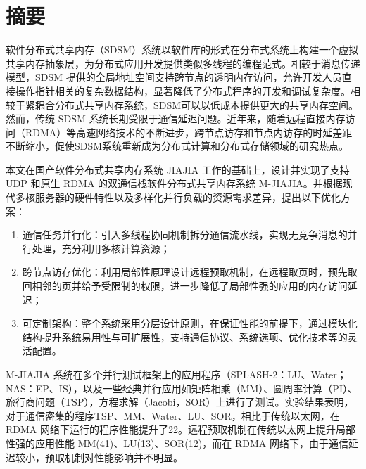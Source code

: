
\maketitle%
\MAKETITLE%
\makedeclaration%
\intobmk\chapter*{摘\quad 要}%
\setcounter{page}{1}%
软件分布式共享内存（SDSM）系统以软件库的形式在分布式系统上构建一个虚拟共享内存抽象层，为分布式应用开发提供类似多线程的编程范式。相较于消息传递模型，SDSM 提供的全局地址空间支持跨节点的透明内存访问，允许开发人员直接操作指针相关的复杂数据结构，显著降低了分布式程序的开发和调试复杂度。相较于紧耦合分布式共享内存系统，SDSM可以以低成本提供更大的共享内存空间。然而，传统 SDSM 系统长期受限于通信延迟问题。近年来，随着远程直接内存访问（RDMA）等高速网络技术的不断进步，跨节点访存和节点内访存的时延差距不断缩小，促使SDSM系统重新成为分布式计算和分布式存储领域的研究热点。

本文在国产软件分布式共享内存系统 JIAJIA 工作的基础上，设计并实现了支持 UDP 和原生 RDMA 的双通信栈软件分布式共享内存系统 M-JIAJIA。并根据现代多核服务器的硬件特性以及多样化并行负载的资源需求差异，提出以下优化方案：
\begin{enumerate}[label=\arabic*.]
    \item 通信任务并行化：引入多线程协同机制拆分通信流水线，实现无竞争消息的并行处理，充分利用多核计算资源；
    \item 跨节点访存优化：利用局部性原理设计远程预取机制，在远程取页时，预先取回相邻的页并给予受限制的权限，进一步降低了局部性强的应用的内存访问延迟；
    \item 可定制架构：整个系统采用分层设计原则，在保证性能的前提下，通过模块化结构提升系统易用性与可扩展性，支持通信协议、系统选项、优化技术等的灵活配置。
\end{enumerate}

M-JIAJIA 系统在多个并行测试框架上的应用程序（SPLASH-2：LU、Water；NAS：EP、IS），以及一些经典并行应用如矩阵相乘（MM）、圆周率计算（PI）、旅行商问题（TSP），方程求解（Jacobi，SOR）上进行了测试。实验结果表明，对于通信密集的程序TSP、MM、Water、LU、SOR，相比于传统以太网，在RDMA 网络下运行的程序性能提升了22\times。远程预取机制在传统以太网上提升局部性强的应用性能 MM(41\times)、LU(13\times)、SOR(12\times)，而在 RDMA 网络下，由于通信延迟较小，预取机制对性能影响并不明显。


